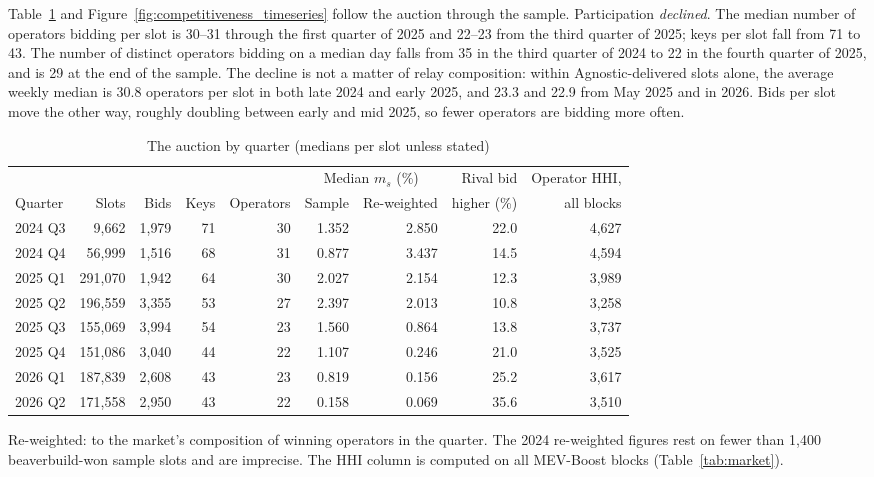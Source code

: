 \documentclass[11pt]{article}
\begin{document}
Table~\ref{tab:quarter} and Figure~\ref{fig:competitiveness_timeseries}
follow the auction through the sample. Participation \emph{declined}. The
median number of operators bidding per slot is 30--31 through the first
quarter of 2025 and 22--23 from the third quarter of 2025; keys per slot
fall from 71 to 43. The number of distinct operators bidding on a median day
falls from 35 in the third quarter of 2024 to 22 in the fourth quarter of
2025, and is 29 at the end of the sample. The decline is not a matter of relay
composition: within Agnostic-delivered slots alone, the average weekly
median is 30.8 operators per slot in both late 2024 and early 2025, and 23.3
and 22.9 from May 2025 and in 2026. Bids per slot move the other way, roughly
doubling between early and mid 2025, so fewer operators are bidding more
often.

\begin{table}[!htbp]
\centering
\small
\caption{The auction by quarter (medians per slot unless stated)}
\label{tab:quarter}
\begin{tabular}{lrrrrrrrr}
\toprule
 & & & & & \multicolumn{2}{c}{Median $m_s$ (\%)} & Rival bid & Operator HHI, \\
Quarter & Slots & Bids & Keys & Operators & Sample & Re-weighted & higher (\%) & all blocks \\
\midrule
2024 Q3 & 9{,}662 & 1{,}979 & 71 & 30 & 1.352 & 2.850 & 22.0 & 4{,}627 \\
2024 Q4 & 56{,}999 & 1{,}516 & 68 & 31 & 0.877 & 3.437 & 14.5 & 4{,}594 \\
2025 Q1 & 291{,}070 & 1{,}942 & 64 & 30 & 2.027 & 2.154 & 12.3 & 3{,}989 \\
2025 Q2 & 196{,}559 & 3{,}355 & 53 & 27 & 2.397 & 2.013 & 10.8 & 3{,}258 \\
2025 Q3 & 155{,}069 & 3{,}994 & 54 & 23 & 1.560 & 0.864 & 13.8 & 3{,}737 \\
2025 Q4 & 151{,}086 & 3{,}040 & 44 & 22 & 1.107 & 0.246 & 21.0 & 3{,}525 \\
2026 Q1 & 187{,}839 & 2{,}608 & 43 & 23 & 0.819 & 0.156 & 25.2 & 3{,}617 \\
2026 Q2 & 171{,}558 & 2{,}950 & 43 & 22 & 0.158 & 0.069 & 35.6 & 3{,}510 \\
\bottomrule
\end{tabular}

\vspace{0.5em}
\footnotesize Re-weighted: to the market's composition of winning operators
in the quarter. The 2024 re-weighted figures rest on fewer than 1,400
beaverbuild-won sample slots and are imprecise. The HHI column is computed
on all MEV-Boost blocks (Table~\ref{tab:market}).
\end{table}
\end{document}
